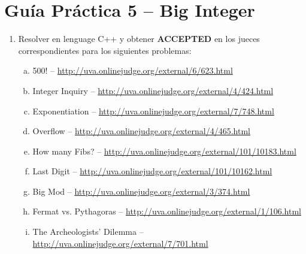 




\section*{Gu\'ia Pr\'actica 5 -- Big Integer}

\begin{enumerate}[1 -]
	
	\item Resolver en lenguage C++ y obtener \textbf{ACCEPTED} en los jueces correspondientes para los siguientes problemas:
	
	\begin{enumerate}[a)]
		\item 500! -- \href{http://uva.onlinejudge.org/external/6/623.html}{http://uva.onlinejudge.org/external/6/623.html}
		\item Integer Inquiry -- \href{http://uva.onlinejudge.org/external/4/424.html}{http://uva.onlinejudge.org/external/4/424.html}
		\item Exponentiation -- \href{http://uva.onlinejudge.org/external/7/748.html}{http://uva.onlinejudge.org/external/7/748.html}
		\item Overflow -- \href{http://uva.onlinejudge.org/external/4/465.html}{http://uva.onlinejudge.org/external/4/465.html}
		\item How many Fibs? -- \href{http://uva.onlinejudge.org/external/101/10183.html}{http://uva.onlinejudge.org/external/101/10183.html}
		\item Last Digit -- \href{http://uva.onlinejudge.org/external/101/10162.html}{http://uva.onlinejudge.org/external/101/10162.html}
		\item Big Mod -- \href{http://uva.onlinejudge.org/external/3/374.html}{http://uva.onlinejudge.org/external/3/374.html}
		\item Fermat vs. Pythagoras -- \href{http://uva.onlinejudge.org/external/1/106.html}{http://uva.onlinejudge.org/external/1/106.html}
		\item The Archeologists’ Dilemma -- \href{http://uva.onlinejudge.org/external/7/701.html}{http://uva.onlinejudge.org/external/7/701.html}														
	\end{enumerate}

\end{enumerate}






